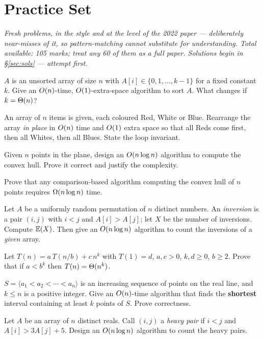 

\section{Practice Set}

\noindent\emph{Fresh problems, in the style and at the level of the 2022 paper --- deliberately
near-misses of it, so pattern-matching cannot substitute for understanding. Total available: 105
marks; treat any 60 of them as a full paper. Solutions begin in \S\ref{sec:sols} --- attempt
first.}

\setcounter{pq}{0}

 $A$ is an unsorted array of size $n$ with $A[i]\in\{0,1,\dots,k-1\}$ for a fixed constant
$k$. Give an $O(n)$-time, $O(1)$-extra-space algorithm to sort $A$. What changes if
$k=\Theta(n)$?

 An array of $n$ items is given, each coloured Red, White or Blue. Rearrange the array
\emph{in place} in $O(n)$ time and $O(1)$ extra space so that all Reds come first, then all
Whites, then all Blues. State the loop invariant.

 Given $n$ points in the plane, design an $O(n\log n)$ algorithm to compute the convex
hull. Prove it correct and justify the complexity.

 Prove that any comparison-based algorithm computing the convex hull of $n$ points
requires $\Omega(n\log n)$ time.

 Let $A$ be a uniformly random permutation of $n$ distinct numbers. An \emph{inversion} is
a pair $(i,j)$ with $i<j$ and $A[i]>A[j]$; let $X$ be the number of inversions. Compute $\mathbb{E}(X)$.
Then give an $O(n\log n)$ algorithm to count the inversions of a \emph{given} array.

 Let $T(n)=a\,T(n/b)+c\,n^k$ with $T(1)=d$, $a,c>0$, $k,d\ge0$, $b\ge2$. Prove that if
$a<b^k$ then $T(n)=\Theta(n^k)$.

$S=\langle a_1<a_2<\cdots<a_n\rangle$ is an increasing sequence of points on the real line, and
$k\le n$ is a positive integer. Give an $O(n)$-time algorithm that finds the \textbf{shortest}
interval containing at least $k$ points of $S$. Prove correctness.

Let $A$ be an array of $n$ distinct reals. Call $(i,j)$ a \emph{heavy pair} if $i<j$ and
$A[i]>3A[j]+5$. Design an $O(n\log n)$ algorithm to count the heavy pairs.


